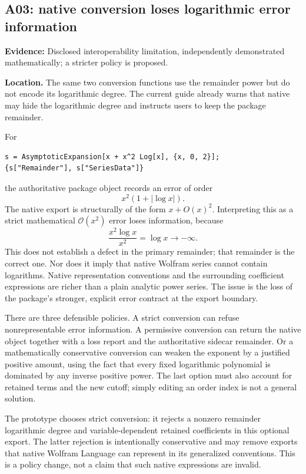 \documentclass[11pt,a4paper]{article}
\newcommand{\code}[1]{\texttt{\detokenize{#1}}}
\newcommand{\OO}{\mathcal O}
\newcommand{\status}[1]{\textbf{Evidence:} #1.}
\theoremstyle{remark}\newtheorem{remark}[proposition]{Remark}
\begin{document}
\subsection{A03: native conversion loses logarithmic error information}\label{sec:a03}
\status{Disclosed interoperability limitation, independently demonstrated mathematically; a stricter policy is proposed}

\textbf{Location.} The same two conversion functions use the remainder power but do not encode its logarithmic degree. The current guide already warns that native \code{SeriesData} may hide the logarithmic degree and instructs users to keep the package remainder.\cite{core,guide}

For
\begin{lstlisting}
s = AsymptoticExpansion[x + x^2 Log[x], {x, 0, 2}];
{s["Remainder"], s["SeriesData"]}
\end{lstlisting}
the authoritative package object records an error of order
\[
 x^2(1+|\log x|).
\]
The native export is structurally of the form $x+O(x)^2$. Interpreting this as a strict mathematical $\OO(x^2)$ error loses information, because
\[
 \frac{x^2\log x}{x^2}=\log x\longrightarrow-\infty.
\]
This does not establish a defect in the primary \code{GeneralizedSeries} remainder; that remainder is the correct one. Nor does it imply that native Wolfram series cannot contain logarithms. Native representation conventions and the surrounding coefficient expressions are richer than a plain analytic power series. The issue is the loss of the package's stronger, explicit error contract at the export boundary.\cite{wl-seriesdata,wl-o}

There are three defensible policies. A strict conversion can refuse nonrepresentable error information. A permissive conversion can return the native object together with a loss report and the authoritative sidecar remainder. Or a mathematically conservative conversion can weaken the exponent by a justified positive amount, using the fact that every fixed logarithmic polynomial is dominated by any inverse positive power. The last option must also account for retained terms and the new cutoff; simply editing an order index is not a general solution.

The prototype chooses strict conversion: it rejects a nonzero remainder logarithmic degree and variable-dependent retained coefficients in this optional export. The latter rejection is intentionally conservative and may remove exports that native Wolfram Language can represent in its generalized conventions. This is a policy change, not a claim that such native expressions are invalid.
\end{document}
